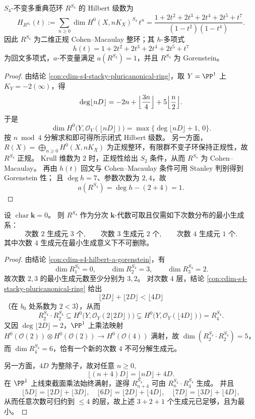 \begin{conclusion}\label{con:cdim-s4-hilbert-a-gorenstein}
\(S_4\)-不变多重典范环 \(R^{S_4}\) 的 Hilbert 级数为
\[
H_{R^{S_4}}(t)
:=
\sum_{n\ge0}\dim H^0(X,nK_X)^{S_4}\,t^n
=
\frac{1+2t^2+2t^3+2t^4+2t^5+t^7}{(1-t^2)(1-t^4)}.
\]
因此 \(R^{S_4}\) 为二维正规 Cohen--Macaulay 整环；其 \(h\)-多项式
\[
h(t)=1+2t^2+2t^3+2t^4+2t^5+t^7
\]
为回文多项式，\(a\)-不变量满足 \(a(R^{S_4})=1\)，并且 \(R^{S_4}\) 为 Gorenstein。
\end{conclusion}
\begin{proof}
由结论 \ref{con:cdim-s4-stacky-pluricanonical-ring}，取 \(Y=\PP^1\) 上 \(K_Y=-2(\infty)\)，得
\[
\deg\lfloor nD\rfloor
=
-2n+\Bigl\lfloor\frac{3n}{4}\Bigr\rfloor+5\Bigl\lfloor\frac{n}{2}\Bigr\rfloor.
\]
于是
\[
\dim H^0\!\bigl(Y,\mathcal O_Y(\lfloor nD\rfloor)\bigr)
=
\max\!\bigl\{\deg\lfloor nD\rfloor+1,\,0\bigr\}.
\]
按 \(n\bmod 4\) 分解求和即可得所示闭式 Hilbert 级数。
另一方面，\(R(X)=\bigoplus_{n\ge0}H^0(X,nK_X)\) 为正规整环，有限群不变子环保持正规性，故 \(R^{S_4}\) 正规。
Krull 维数为 \(2\) 时，正规性给出 \(S_2\) 条件，从而 \(R^{S_4}\) 为 Cohen--Macaulay。
再由 \(h(t)\) 回文与 Cohen--Macaulay 条件可用 Stanley 判别得到 Gorenstein 性；
且 \(\deg h=7\)、参数次数为 \(2,4\)，故
\[
a(R^{S_4})=\deg h-(2+4)=1.
\]
\end{proof}

\begin{conclusion}[最小代数生成中的四次不可约层]\label{con:cdim-s4-minimal-generators-degree-profile}
设 \(\operatorname{char}\mathbf k=0\)。
则 \(R^{S_4}\) 作为分次 \(\mathbf k\)-代数可取且仅需如下次数分布的最小生成系：
\[
\text{次数 }2\text{ 生成元 }3\text{ 个},\qquad
\text{次数 }3\text{ 生成元 }2\text{ 个},\qquad
\text{次数 }4\text{ 生成元 }1\text{ 个}.
\]
其中次数 \(4\) 生成元在最小生成意义下不可删除。
\end{conclusion}
\begin{proof}
由结论 \ref{con:cdim-s4-hilbert-a-gorenstein}，有
\[
\dim R^{S_4}_1=0,\qquad
\dim R^{S_4}_2=3,\qquad
\dim R^{S_4}_3=2.
\]
故次数 \(2,3\) 的最小生成元数至少分别为 \(3,2\)。
对次数 \(4\) 层，结论 \ref{con:cdim-s4-stacky-pluricanonical-ring} 给出
\[
\lfloor 2D\rfloor+\lfloor 2D\rfloor<\lfloor 4D\rfloor
\]
（在 \(b_0\) 处系数为 \(2<3\)），从而
\[
R^{S_4}_2\cdot R^{S_4}_2
\subseteq
H^0\!\bigl(Y,\mathcal O_Y(2\lfloor 2D\rfloor)\bigr)
\subsetneq
H^0\!\bigl(Y,\mathcal O_Y(\lfloor 4D\rfloor)\bigr)=R^{S_4}_4.
\]
又因 \(\deg\lfloor2D\rfloor=2\)，\(\PP^1\) 上乘法映射
\(
H^0(\mathcal O(2))\otimes H^0(\mathcal O(2))\to H^0(\mathcal O(4))
\)
满射，故 \(\dim(R^{S_4}_2\cdot R^{S_4}_2)=5\)，而 \(\dim R^{S_4}_4=6\)，恰有一个新的次数 \(4\) 不可分解生成元。

另一方面，\(4D\) 为整除子，故对任意 \(n\ge0\),
\[
\lfloor(n+4)D\rfloor=\lfloor nD\rfloor+4D.
\]
在 \(\PP^1\) 上线束截面乘法始终满射，遂得 \(R^{S_4}_{n+4}\) 可由 \(R^{S_4}_n\cdot R^{S_4}_4\) 生成。
并且
\[
\lfloor5D\rfloor=\lfloor2D\rfloor+\lfloor3D\rfloor,\quad
\lfloor6D\rfloor=\lfloor2D\rfloor+\lfloor4D\rfloor,\quad
\lfloor7D\rfloor=\lfloor3D\rfloor+\lfloor4D\rfloor,
\]
从而任意次数可归约到 \(\le4\) 的层，故上述 \(3+2+1\) 个生成元已足够，且为最小。
\end{proof}


